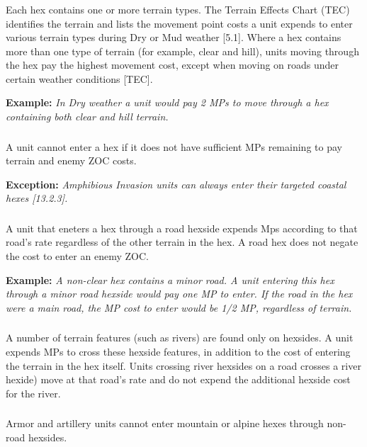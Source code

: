 \subsubsection{}
Each hex contains one or more terrain types. The Terrain Effects Chart (TEC) identifies the terrain and lists the movement point costs a unit expends to enter various terrain types during Dry or Mud weather [5.1]. Where a hex contains more than one type of terrain (for example, clear and hill), units moving through the hex pay the highest movement cost, except when moving on roads under certain weather conditions [TEC].

\textbf{Example:} \textit{In Dry weather a unit would pay 2 MPs to move through a hex containing both clear and hill terrain.}

\subsubsection{}
A unit cannot enter a hex if it does not have sufficient MPs remaining to pay terrain and enemy ZOC costs.

\textbf{Exception:} \textit{Amphibious Invasion units can always enter their targeted coastal hexes [13.2.3].}

\subsubsection{}
A unit that eneters a hex through a road hexside expends Mps according to that road's rate regardless of the other terrain in the hex. A road hex does not negate the cost to enter an enemy ZOC.

\textbf{Example:} \textit{A non-clear hex contains a minor road. A unit entering this hex through a minor road hexside would pay one MP to enter. If the road in the hex were a main road, the MP cost to enter would be 1/2 MP, regardless of terrain.}

\subsubsection{}
A number of terrain features (such as rivers) are found only on hexsides. A unit expends MPs to cross these hexside features, in addition to the cost of entering the terrain in the hex itself. Units crossing river hexsides on a road crosses a river hexide) move at that road's rate and do not expend the additional hexside cost for the river.

\subsubsection{}
Armor and artillery units cannot enter mountain or alpine hexes through non-road hexsides.


